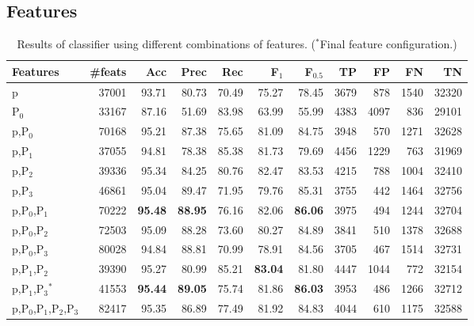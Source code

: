 \documentclass[11pt]{article}
\begin{document}
\subsection{Features}
\label{sec-4-1}

\begin{table}[tbp]

\begin{tabular}{lrrrrrrrrrr}
{\bf Features} & {\bf \#feats} & {\bf Acc} & {\bf Prec} & {\bf Rec} & {\bf F$_{\text{1}}$} & {\bf F$_{\text{0.5}}$} & {\bf TP} & {\bf FP} & {\bf FN} & {\bf TN} \\
\hline
p & 37001 & 93.71 & 80.73 & 70.49 & 75.27 & 78.45 & 3679 & 878 & 1540 & 32320\\
P$_{\text{0}}$ & 33167 & 87.16 & 51.69 & 83.98 & 63.99 & 55.99 & 4383 & 4097 & 836 & 29101\\
\hline
p,P$_{\text{0}}$ & 70168 & 95.21 & 87.38 & 75.65 & 81.09 & 84.75 & 3948 & 570 & 1271 & 32628\\
p,P$_{\text{1}}$ & 37055 & 94.81 & 78.38 & 85.38 & 81.73 & 79.69 & 4456 & 1229 & 763 & 31969\\
p,P$_{\text{2}}$ & 39336 & 95.34 & 84.25 & 80.76 & 82.47 & 83.53 & 4215 & 788 & 1004 & 32410\\
p,P$_{\text{3}}$ & 46861 & 95.04 & 89.47 & 71.95 & 79.76 & 85.31 & 3755 & 442 & 1464 & 32756\\
\hline
p,P$_{\text{0}}$,P$_{\text{1}}$ & 70222 & {\bf 95.48} & {\bf 88.95} & 76.16 & 82.06 & {\bf 86.06} & 3975 & 494 & 1244 & 32704\\
p,P$_{\text{0}}$,P$_{\text{2}}$ & 72503 & 95.09 & 88.28 & 73.60 & 80.27 & 84.89 & 3841 & 510 & 1378 & 32688\\
p,P$_{\text{0}}$,P$_{\text{3}}$ & 80028 & 94.84 & 88.81 & 70.99 & 78.91 & 84.56 & 3705 & 467 & 1514 & 32731\\
\hline
p,P$_{\text{1}}$,P$_{\text{2}}$ & 39390 & 95.27 & 80.99 & 85.21 & {\bf 83.04} & 81.80 & 4447 & 1044 & 772 & 32154\\
p,P$_{\text{1}}$,P$_{\text{3}}$$^{*}$ & 41553 & {\bf 95.44} & {\bf 89.05} & 75.74 & 81.86 & {\bf 86.03} & 3953 & 486 & 1266 & 32712\\
\hline
p,P$_{\text{0}}$,P$_{\text{1}}$,P$_{\text{2}}$,P$_{\text{3}}$ & 82417 & 95.35 & 86.89 & 77.49 & 81.92 & 84.83 & 4044 & 610 & 1175 & 32588\\
\end{tabular}

\caption{Results of classifier using different combinations of features.
($^{*}$Final feature configuration.)}
\label{tbl:feature-evaluation}
\end{table}
\end{document}
